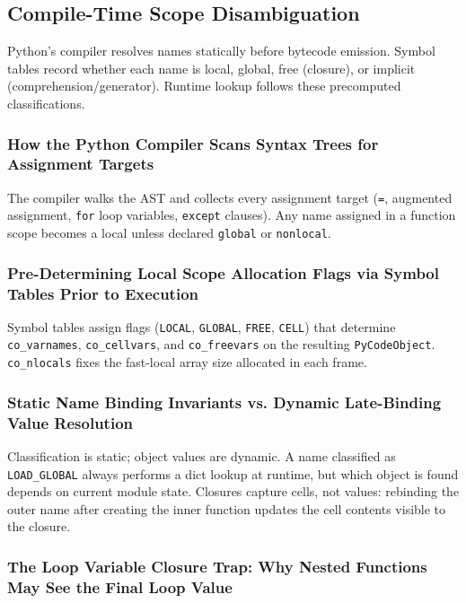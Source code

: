 \subsection{Compile-Time Scope Disambiguation}

Python's compiler resolves names statically before bytecode emission. Symbol tables record whether each name is local, global, free (closure), or implicit (comprehension/generator). Runtime lookup follows these precomputed classifications.

\subsubsection{How the Python Compiler Scans Syntax Trees for Assignment Targets}

The compiler walks the AST and collects every assignment target (\texttt{=}, augmented assignment, \texttt{for} loop variables, \texttt{except} clauses). Any name assigned in a function scope becomes a local unless declared \texttt{global} or \texttt{nonlocal}.

\subsubsection{Pre-Determining Local Scope Allocation Flags via Symbol Tables Prior to Execution}

Symbol tables assign flags (\texttt{LOCAL}, \texttt{GLOBAL}, \texttt{FREE}, \texttt{CELL}) that determine \texttt{co\_varnames}, \texttt{co\_cellvars}, and \texttt{co\_freevars} on the resulting \texttt{PyCodeObject}. \texttt{co\_nlocals} fixes the fast-local array size allocated in each frame.

\subsubsection{Static Name Binding Invariants vs. Dynamic Late-Binding Value Resolution}

Classification is static; object values are dynamic. A name classified as \texttt{LOAD\_GLOBAL} always performs a dict lookup at runtime, but which object is found depends on current module state. Closures capture cells, not values: rebinding the outer name after creating the inner function updates the cell contents visible to the closure.

\subsubsection{The Loop Variable Closure Trap: Why Nested Functions May See the Final Loop Value}

